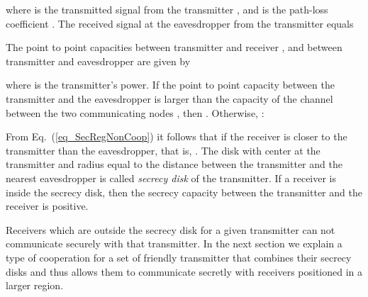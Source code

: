 \documentclass[conference,a4paper]{IEEEtran}
\begin{document}
where  is the transmitted signal from the transmitter , and  is the path-loss coefficient \cite{Rappaport:book}.
The received signal at the eavesdropper  from the transmitter  equals


The point to point capacities between transmitter  and receiver , and between transmitter  and  eavesdropper  are given by \cite{Hellman:1978}

where  is the transmitter's power.
If the point to point capacity between the transmitter and the eavesdropper  is
larger than the capacity of the channel between the two communicating nodes , then .
Otherwise,  \cite{Hellman:1978}:

From Eq.~(\ref{eq_SecRegNonCoop}) it follows that  if the receiver  is closer to the transmitter than the eavesdropper, that is, .
The disk  with center at the transmitter and radius equal to the distance between the transmitter and the nearest eavesdropper is called {\em secrecy disk} of the transmitter.
If a receiver is inside the secrecy disk, then the secrecy capacity between the transmitter and the receiver is positive.

Receivers which are outside the secrecy disk for a given transmitter can not communicate securely with that transmitter.
In the next section we explain a type of cooperation for a set of friendly transmitter that combines their secrecy disks 
and thus allows them to communicate secretly with receivers positioned in a larger region.
\end{document}
